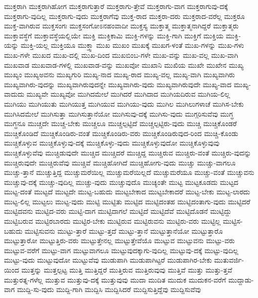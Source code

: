 {ಮುಕ್ತರಾಗಿ
ಮುಕ್ತರಾಗಿಹೋಗ
ಮುಕ್ತರಾಗುತ್ತಾರೆ
ಮುಕ್ತರಾಗು-ತ್ತೇವೆ
ಮುಕ್ತರಾಗು-ವಾಗ
ಮುಕ್ತರಾಗುವು-ದಕ್ಕೆ
ಮುಕ್ತರಾಗು-ವುದಿಲ್ಲ
ಮುಕ್ತರಾಗು-ವುದು
ಮುಕ್ತರಾಗೆವು
ಮುಕ್ತ-ರಾದ
ಮುಕ್ತರಾ-ದರು
ಮುಕ್ತರಾದ-ವರೆಲ್ಲ
ಮುಕ್ತರೂ
ಮುಕ್ತ-ವಾಗಿರುವ
ಮುಕ್ತಸಂಗಃ
ಮುಕ್ತಸಂಗೋಽನಹಂವಾದೀ
ಮುಕ್ತಸ್ಯ
ಮುಕ್ತಾತ್ಮ
ಮುಕ್ತಾತ್ಮನಾಗಿದ್ದರೆ
ಮುಕ್ತಾತ್ಮರು
ಮುಕ್ತಾವಸ್ಥೆಗೆ
ಮುಕ್ತಾವಸ್ಥೆಯಲ್ಲಿಯೇ
ಮುಕ್ತಿ
ಮುಕ್ತಿಕಾಮಿ
ಮುಕ್ತಿ-ಗಳನ್ನು
ಮುಕ್ತಿ-ಗಾಗಿ
ಮುಕ್ತಿಗೆ
ಮುಕ್ತಿಯ
ಮುಕ್ತಿ-ಯನ್ನು
ಮುಕ್ತಿ-ಯಲ್ಲ
ಮುಕ್ತಿಯೂ
ಮುಕ್ತ್ವಾ
ಮುಖ
ಮುಖಂ
ಮುಖಕ್ಕೆ
ಮುಖಗ-ಳಂತೆ
ಮುಖ-ಗಳನ್ನು
ಮುಖ-ಗಳು
ಮುಖ-ಗಳೇ
ಮುಖದ
ಮುಖ-ದಲ್ಲಿ
ಮುಖ-ದಿಂದ
ಮುಖಬಿಂಬ-ಗಳೇ
ಮುಖ-ವನ್ನು
ಮುಖ-ವಲ್ಲ
ಮುಖ-ವಾಗಿ
ಮುಖವಾಡ
ಮುಖವಾಡ-ಗಳಲ್ಲಿ
ಮುಖವಾಡ-ವನ್ನು
ಮುಖವೋ
ಮುಖಾನಿ
ಮುಖಿಯ
ಮುಖೇ
ಮುಖೇನ
ಮುಖ್ಯ
ಮುಖ್ಯಂ
ಮುಖ್ಯಅವನು
ಮುಖ್ಯಗುರಿ
ಮುಖ್ಯ-ನಾದ
ಮುಖ್ಯ-ರಾದ
ಮುಖ್ಯ-ವಲ್ಲ
ಮುಖ್ಯ-ವಾಗಿ
ಮುಖ್ಯವಾಗಿರು
ಮುಖ್ಯವಾಗಿರು-ವುದನ್ನು
ಮುಖ್ಯವಾಗಿರುವುದನ್ನೇ
ಮುಖ್ಯವಾಗಿರು-ವುದು
ಮುಖ್ಯವಾಗಿರುವುದೇ
ಮುಖ್ಯ-ವಾದ
ಮುಖ್ಯ-ವಾದುದು
ಮುಖ್ಯವೇ
ಮುಖ್ಯವೋ
ಮುಗಿದಮೇಲೆ
ಮುಗಿದರೆ
ಮುಗಿದಾದ
ಮುಗಿಯದಿರುವ
ಮುಗಿಯ-ಲಿಲ್ಲ
ಮುಗಿಯು
ಮುಗಿಯುತು
ಮುಗಿಯುತ್ತ
ಮುಗಿಯುವ
ಮುಗಿಯು-ವುದು
ಮುಗಿಲ
ಮುಗಿಲುಗಳಾಚೆ
ಮುಗಿಸ-ಬೇಕು
ಮುಗಿಸಿದಮೇಲೆ
ಮುಗಿಸುತ್ತಾ
ಮುಗಿಸುತ್ತಾನೆಯೋ
ಮುಗಿಸುವು-ದಕ್ಕೆ
ಮುಗಿಸು-ವುದು
ಮುಗ್ಗರಿಸುವೆವು
ಮುಗ್ಧ
ಮುಗ್ಧನೂ
ಮುಚ್ಚದೇ
ಮುಚ್ಚ-ಬೇಕು
ಮುಚ್ಚಲೂ
ಮುಚ್ಚಲ್ಪಟ್ಟಿದೆ
ಮುಚ್ಚಲ್ಪಟ್ಟಿರು-ವುದು
ಮುಚ್ಚಿ
ಮುಚ್ಚಿಕೊಂಡರೆ
ಮುಚ್ಚಿಕೊಂಡಿದೆ
ಮುಚ್ಚಿಕೊಂಡಿರು-ವಂತೆ
ಮುಚ್ಚಿಕೊಂಡಿರು-ವರು
ಮುಚ್ಚಿಕೊಂಡಿರುವುದ-ರಿಂದ
ಮುಚ್ಚಿ-ಕೊಂಡು
ಮುಚ್ಚಿಕೊಳ್ಳುವ
ಮುಚ್ಚಿಕೊಳ್ಳುವು-ದಕ್ಕೆ
ಮುಚ್ಚಿಕೊಳ್ಳು-ವುದು
ಮುಚ್ಚಿಕೊಳ್ಳುವುದೋ
ಮುಚ್ಚಿಕೊಳ್ಳುವುವು
ಮುಚ್ಚಿಕೊಳ್ಳುವೆವು
ಮುಚ್ಚಿಡುವುದೇ
ಮುಚ್ಚಿದ
ಮುಚ್ಚಿದರೆ
ಮುಚ್ಚಿದ್ದ
ಮುಚ್ಚಿರುವ
ಮುಚ್ಚಿರು-ವಂತೆ
ಮುಚ್ಚಿರು-ವುದನ್ನು
ಮುಚ್ಚಿರುವುದೇ
ಮುಚ್ಚಿರುವೆವು
ಮುಚ್ಚಿವೆ
ಮುಚ್ಚಿಹೋಗಿದೆ
ಮುಚ್ಚಿಹೋಗು-ವುದು
ಮುಚ್ಚು
ಮುಚ್ಚು-ವಾಗಲೂ
ಮುಚ್ಚು-ತ್ತಾನೆ
ಮುಚ್ಚುತ್ತಿದ್ದ
ಮುಚ್ಚುಮರೆಯಿಲ್ಲ
ಮುಚ್ಚುಮರೆಯಿಲ್ಲದೆ
ಮುಚ್ಚುಮರೆಯೂ
ಮುಚ್ಚು-ವಂತೆ
ಮುಚ್ಚುವನು
ಮುಚ್ಚುವು-ದಕ್ಕೆ
ಮುಚ್ಚು-ವುದಿಲ್ಲ
ಮುಚ್ಚು-ವುದು
ಮುಚ್ಚುವುದೊ
ಮುಚ್ಯಂತೇ
ಮುಟ್ಟ
ಮುಟ್ಟಕೂಡದು
ಮುಟ್ಟದ
ಮುಟ್ಟ-ದಂತೆ
ಮುಟ್ಟದೆ
ಮುಟ್ಟದೇ
ಮುಟ್ಟ-ಬಹುದು
ಮುಟ್ಟಬೇಕಾದ
ಮುಟ್ಟಬೇಕಾದರೆ
ಮುಟ್ಟ-ಬೇಕು
ಮುಟ್ಟ-ಲಾರದು
ಮುಟ್ಟ-ಲಿಲ್ಲ
ಮುಟ್ಟಲು
ಮುಟ್ಟ-ವುದು
ಮುಟ್ಟಿ
ಮುಟ್ಟಿತು
ಮುಟ್ಟಿದ
ಮುಟ್ಟಿದಂತಹ
ಮುಟ್ಟಿದಂತಾಗು-ವುದು
ಮುಟ್ಟಿದರೆ
ಮುಟ್ಟಿದವನು
ಮುಟ್ಟಿದ-ವರು
ಮುಟ್ಟಿ-ದಾಗ
ಮುಟ್ಟಿದಾಗಲೆ
ಮುಟ್ಟಿದೆ
ಮುಟ್ಟಿದೆವೆ
ಮುಟ್ಟಿದೊಡನೆ
ಮುಟ್ಟಿದ್ದು
ಮುಟ್ಟಿಬರುವ
ಮುಟ್ಟಿರಬಾರದು
ಮುಟ್ಟಿರ-ಬೇಕು
ಮುಟ್ಟಿರುವ
ಮುಟ್ಟಿರುವನು
ಮುಟ್ಟಿರು-ವರು
ಮುಟ್ಟಿಲ್ಲ
ಮುಟ್ಟಿಸ-ಬಹುದು
ಮುಟ್ಟಿಸುವನು
ಮುಟ್ಟು-ತ್ತಾರೆ
ಮುಟ್ಟು-ತ್ತದೆ
ಮುಟ್ಟು-ತ್ತಾನೆ
ಮುಟ್ಟುತ್ತಾನೆಯೋ
ಮುಟ್ಟುತ್ತಾರೊ
ಮುಟ್ಟುತ್ತಾರೋ
ಮುಟ್ಟುತ್ತಿರು-ವರು
ಮುಟ್ಟುತ್ತೇನಲ್ಲ
ಮುಟ್ಟುತ್ತೇವೆಯೊ
ಮುಟ್ಟುವ
ಮುಟ್ಟುವನು
ಮುಟ್ಟು-ವರು
ಮುಟ್ಟುವ-ವರೆಗೆ
ಮುಟ್ಟು-ವಾಗ
ಮುಟ್ಟುವಾಗಲೂ
ಮುಟ್ಟುವುದಕ್ಕಾಗು-ವುದಿಲ್ಲ
ಮುಟ್ಟುವು-ದಕ್ಕೆ
ಮುಟ್ಟು-ವುದಿಲ್ಲ
ಮುಟ್ಟು-ವುದು
ಮುಟ್ಟುವುದೋ
ಮುಟ್ಟುವೆವು
ಮುಡುಪಾಗಿ
ಮುಡುಪಾಗಿಟ್ಟರೆ
ಮುಡುಪಾಗಿರ-ಬೇಕು
ಮುತುವರ್ಜಿ-ಯಿಂದ
ಮುತ್ತನ್ನು
ಮುತ್ತಲ್ಪಟ್ಟ
ಮುತ್ತಿ
ಮುತ್ತಿದ್ದರೆ
ಮುತ್ತಿರುವ
ಮುತ್ತಿರುವುವು
ಮುತ್ತಿವೆ
ಮುತ್ತು
ಮುತ್ತು-ತ್ತವೆ
ಮುತ್ತುರತ್ನ-ಗಳೆಲ್ಲ
ಮುತ್ತುವ
ಮುತ್ತುವು-ದಕ್ಕೆ
ಮುತ್ತುವುವು
ಮುದಾ
ಮುದಿತ
ಮುದುಕ
ಮುದುಕನ-ವರೆಗೆ
ಮುದ್ದಾಡು-ವಾಗ
ಮುದ್ದಿ-ಸು-ವುದು
ಮುದ್ದಿ-ಗಾಗಿ
ಮುದ್ದಿಸಿ
ಮುದ್ದಿಸಿದರೆ
ಮುದ್ದಿಸುತ್ತಿದ್ದೆವು
ಮುದ್ದಿಸುವೆವು
}
